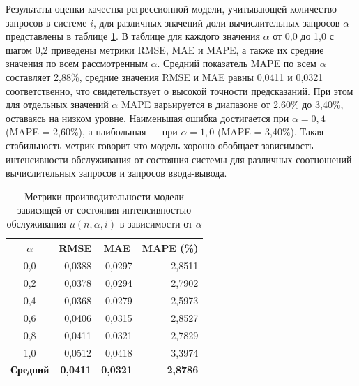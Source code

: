 \documentclass[12pt,a4paper]{article}
\begin{document}
Результаты оценки качества регрессионной модели, учитывающей количество запросов в системе $i$, для различных значений доли вычислительных запросов $\alpha$ представлены в таблице \ref{tab:QueuingModel_mu_alpha_i_metrics}. В таблице для каждого значения $\alpha$ от 0,0 до 1,0 с шагом 0,2 приведены метрики RMSE, MAE и MAPE, а также их средние значения по всем рассмотренным $\alpha$. Средний показатель MAPE по всем $\alpha$ составляет 2,88\%, средние значения RMSE и MAE равны 0,0411 и 0,0321 соответственно, что свидетельствует о высокой точности предсказаний. При этом для отдельных значений $\alpha$ MAPE варьируется в диапазоне от 2,60\% до 3,40\%, оставаясь на низком уровне. Наименьшая ошибка достигается при $\alpha = 0,4$ (MAPE = 2,60\%), а наибольшая — при $\alpha = 1,0$ (MAPE = 3,40\%). Такая стабильность метрик говорит что модель хорошо обобщает зависимость интенсивности обслуживания от состояния системы для различных соотношений вычислительных запросов и запросов ввода-вывода.

\begin{table}[htbp]
  \centering
  \caption{Метрики производительности модели зависящей от состояния интенсивностью обслуживания $\mu(n,\alpha,i)$ в зависимости от $\alpha$}
  \label{tab:QueuingModel_mu_alpha_i_metrics}

  \renewcommand{\arraystretch}{1.2}

  \begin{tabular}{c r r r}
    \toprule
    $\alpha$         & \multicolumn{1}{c}{RMSE} & \multicolumn{1}{c}{MAE} & \multicolumn{1}{c}{MAPE (\%)} \\
    \midrule
    0,0              & 0,0388                   & 0,0297                  & 2,8511                        \\
    0,2              & 0,0378                   & 0,0294                  & 2,7902                        \\
    0,4              & 0,0368                   & 0,0279                  & 2,5973                        \\
    0,6              & 0,0406                   & 0,0315                  & 2,8527                        \\
    0,8              & 0,0411                   & 0,0321                  & 2,7829                        \\
    1,0              & 0,0512                   & 0,0418                  & 3,3974                        \\
    \midrule
    \textbf{Средний} & \textbf{0,0411}          & \textbf{0,0321}         & \textbf{2,8786}               \\
    \bottomrule
  \end{tabular}
\end{table}
\end{document}
